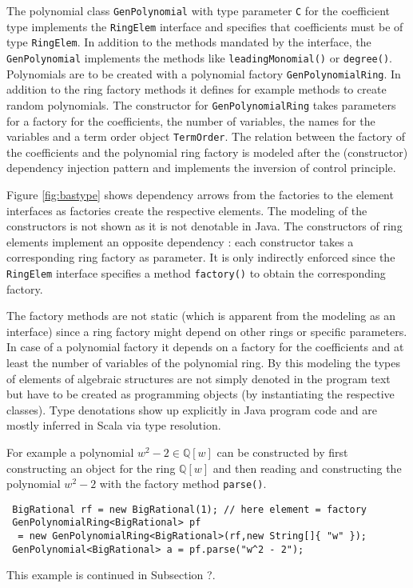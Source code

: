 \documentclass{llncs}
\newcommand{\code}[1]{\texttt{#1}}
\begin{document}
The polynomial class \code{Gen\-Polynomial} with type parameter
\code{C} for the coefficient type implements the \code{Ring\-Elem}
interface and specifies that coefficients must be of type
\code{Ring\-Elem}.  In addition to the methods mandated by the
interface, the \code{Gen\-Polynomial} implements the methods like
\code{leading\-Monomial()} or \code{degree()}.  Polynomials are to be
created with a polynomial factory \code{Gen\-Polynomial\-Ring}. In
addition to the ring factory methods it defines for example methods
to create random polynomials.  The constructor for
\code{Gen\-Polynomial\-Ring} takes parameters for a factory for the
coefficients, the number of variables, the names for the variables and
a term order object \code{Term\-Order}. The relation between the
factory of the coefficients and the polynomial ring factory is modeled
after the (constructor) dependency injection pattern and implements the
inversion of control principle.

Figure \ref{fig:bastype} shows dependency arrows from the factories to
the element interfaces as factories create the respective elements.
The modeling of the constructors is not shown as it is not denotable
in Java. The constructors of ring elements implement an opposite
dependency : each constructor takes a corresponding ring
factory as parameter.  It is only indirectly enforced since the
\code{RingElem} interface specifies a method \code{factory()} to
obtain the corresponding factory.

The factory methods are not static (which is apparent from the
modeling as an interface) since a ring factory might depend on other
rings or specific parameters. In case of a polynomial factory it
depends on a factory for the coefficients and at least the number of
variables of the polynomial ring. By this modeling the types of
elements of algebraic structures are not simply denoted in the program
text but have to be created as programming objects (by instantiating
the respective classes). Type denotations show up explicitly in Java
program code and are mostly inferred in Scala via type resolution.

For example a polynomial $w^2 - 2 \in \mathbb{Q}[w]$ can be
constructed by first constructing an object for the ring
$\mathbb{Q}[w]$ and then reading and constructing the polynomial $w^2
- 2$ with the factory method \code{parse()}.
{\small
\begin{verbatim}
 BigRational rf = new BigRational(1); // here element = factory
 GenPolynomialRing<BigRational> pf 
  = new GenPolynomialRing<BigRational>(rf,new String[]{ "w" });
 GenPolynomial<BigRational> a = pf.parse("w^2 - 2");
\end{verbatim}
}
This example is continued in Subsection ?. %
\end{document}
